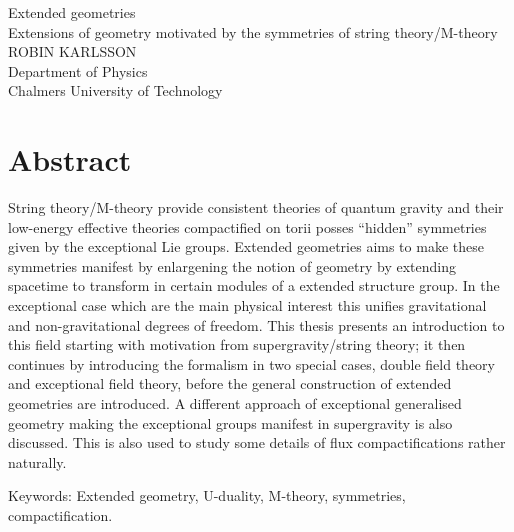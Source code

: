 Extended geometries\\
Extensions of geometry motivated by the symmetries of string theory/M-theory\\
ROBIN KARLSSON\\
Department of Physics\\
Chalmers University of Technology \setlength{\parskip}{0.5cm}

\thispagestyle{plain}			%
\setlength{\parskip}{0pt plus 1.0pt}
\section*{Abstract}
String theory/M-theory provide consistent theories of quantum gravity and their low-energy effective theories compactified on torii posses ``hidden'' symmetries given by the exceptional Lie groups. Extended geometries aims to make these symmetries manifest by enlargening the notion of geometry by extending spacetime to transform in certain modules of a extended structure group. In the exceptional case which are the main physical interest this unifies gravitational and non-gravitational degrees of freedom. This thesis presents an introduction to this field starting with motivation from supergravity/string theory; it then continues by introducing the formalism in two special cases, double field theory and exceptional field theory, before the general construction of extended geometries are introduced. A different approach of exceptional generalised geometry making the exceptional groups manifest in supergravity is also discussed. This is also used to study some details of flux compactifications rather naturally. 

\vfill
Keywords: Extended geometry, U-duality, M-theory, symmetries, compactification.

\newpage				%
\thispagestyle{empty}
\mbox{}
